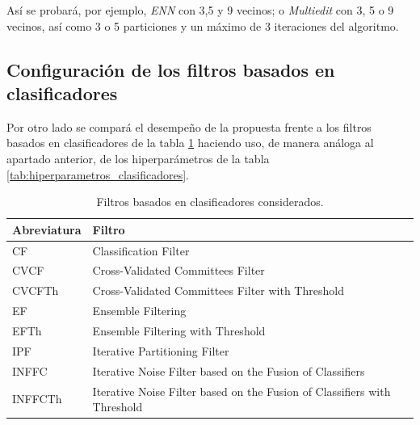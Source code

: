 \documentclass[print, color]{ugrTFG}
\begin{document}
    Así se probará, por ejemplo, \textit{ENN} con 3,5 y 9 vecinos; o \textit{Multiedit} con 3, 5 o 9 vecinos, así como 3 o 5 particiones y un máximo de 3 iteraciones del algoritmo.

    \subsection{Configuración de los filtros basados en clasificadores}
    Por otro lado se compará el desempeño de la propuesta frente a los filtros basados en clasificadores de la tabla \ref{tab:classifier_filters} haciendo uso, de manera análoga al apartado anterior, de los hiperparámetros de la tabla \ref{tab:hiperparametros_clasificadores}.
    \begin{table}[htbp]
        \centering
        \begin{tabular}{ll}
        \hline
        \textbf{Abreviatura} & \textbf{Filtro} \\ \hline
        CF       & Classification Filter \\
        CVCF     & Cross-Validated Committees Filter \\
        CVCFTh   & Cross-Validated Committees Filter with Threshold \\
        EF       & Ensemble Filtering \\
        EFTh     & Ensemble Filtering with Threshold \\
        IPF      & Iterative Partitioning Filter \\
        INFFC    & Iterative Noise Filter based on the Fusion of Classifiers \\
        INFFCTh  & Iterative Noise Filter based on the Fusion of Classifiers with Threshold \\ \hline
        \end{tabular}
        \caption{Filtros basados en clasificadores considerados.}
        \label{tab:classifier_filters}
    \end{table}
    
\end{document}
